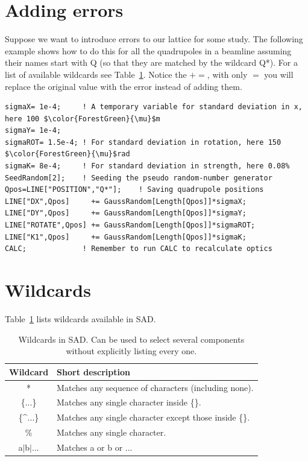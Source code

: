 \documentclass{article}
\begin{document}
\section{Adding errors}
Suppose we want to introduce errors to our lattice for some study. The following example shows how to do this for all the quadrupoles in a beamline assuming their names start with Q (so that they are matched by the wildcard Q*). For a list of available wildcards see Table~\ref{tab:wildcards}. Notice the $+=$, with only $=$ you will replace the original value with the error instead of adding them.
\begin{lstlisting}[mathescape=true]
sigmaX= 1e-4;     ! A temporary variable for standard deviation in x, here 100 $\color{ForestGreen}{\mu}$m
sigmaY= 1e-4;
sigmaROT= 1.5e-4; ! For standard deviation in rotation, here 150 $\color{ForestGreen}{\mu}$rad
sigmaK= 8e-4;     ! For standard deviation in strength, here 0.08%
SeedRandom[2];    ! Seeding the pseudo random-number generator
Qpos=LINE["POSITION","Q*"];    ! Saving quadrupole positions
LINE["DX",Qpos]     += GaussRandom[Length[Qpos]]*sigmaX;
LINE["DY",Qpos]     += GaussRandom[Length[Qpos]]*sigmaY;
LINE["ROTATE",Qpos] += GaussRandom[Length[Qpos]]*sigmaROT;
LINE["K1",Qpos]     += GaussRandom[Length[Qpos]]*sigmaK;
CALC;             ! Remember to run CALC to recalculate optics
\end{lstlisting}


\section{Wildcards}
Table~\ref{tab:wildcards} lists wildcards available in SAD.
\begin{table}[h]
	\begin{center}
	\caption{Wildcards in SAD. Can be used to select several components without explicitly listing every one.}
	\label{tab:wildcards}
	\begin{tabular}[c]{cl}
	Wildcard			&	Short description								\\	\hline
	*				&	Matches any sequence of characters (including none).	\\
	\{...\}				&	Matches any single character inside \{\}.				\\
	\{\textasciicircum ...\}	&	Matches any single character except those inside \{\}.	\\
	\%				&	Matches any single character.						\\
	a$|$b$|$...		&	Matches a or b or ...								\\
	\end{tabular}
	\end{center}
\end{table}
\end{document}
